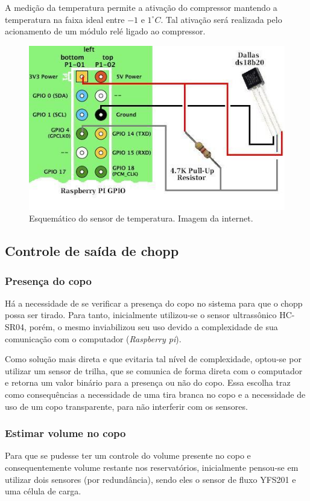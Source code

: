 A medição da temperatura permite a ativação do compressor mantendo a temperatura na faixa
ideal entre $-1$ e $1 ^\circ C$. Tal ativação será realizada pelo acionamento de um módulo relé  
ligado ao compressor. 
    
\begin{figure}[!htb]
           \centering
           \includegraphics[scale= 0.5]{figuras/esquema.jpg}
            \caption{Esquemático do sensor de temperatura. Imagem da internet.}
            \label{esquema-temperatura}
\end{figure}    
    

\subsection{Controle de saída de chopp}

\subsubsection{Presença do copo}
Há a necessidade de se verificar a presença do copo no sistema para que o chopp possa ser tirado. 
Para tanto, inicialmente utilizou-se o sensor ultrassônico HC-SR04, porém, o mesmo inviabilizou seu
uso devido a complexidade de sua comunicação com o computador (\textit{Raspberry pi}).

Como solução mais direta e que evitaria tal nível de complexidade, optou-se por utilizar um sensor de trilha, 
que se comunica de forma direta com o computador e retorna um valor binário para a presença ou não do copo. 
Essa escolha traz como consequências a necessidade de uma tira branca no copo
 e a necessidade de uso de um copo transparente, para não interferir com os sensores.


\subsubsection{Estimar volume no copo}
Para que se pudesse ter um controle do volume presente no copo e consequentemente volume 
restante nos reservatórios, inicialmente pensou-se em utilizar dois sensores (por redundância), 
sendo eles o sensor de fluxo YFS201 e uma célula de carga.

